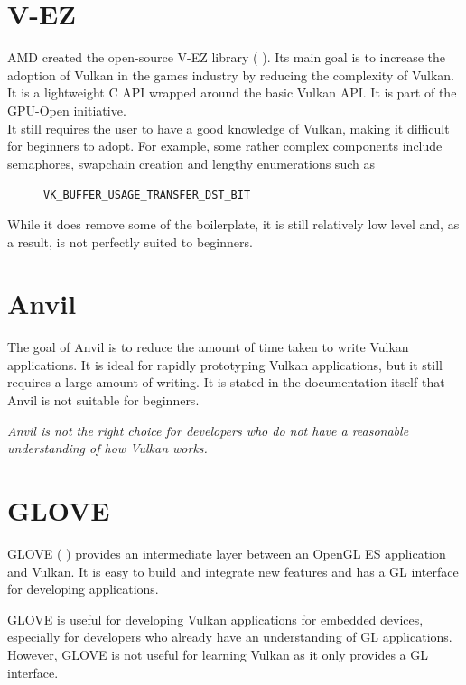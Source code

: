 \documentclass[12pt]{report}
\newcommand{\citesoftware}[1]{(\citeauthor{#1} \citeyear{#1})}
\newcommand{\quotebu}[1]
{
  \begin{displayquote}
    \textit{#1}
  \end{displayquote}
}
\theoremstyle{definition}
\begin{document}
    \section{V-EZ}

      AMD created the open-source V-EZ library \citesoftware{vez}. Its main goal is to increase the
      adoption of Vulkan in the games industry by reducing the complexity of
      Vulkan. It is a lightweight C API wrapped around the basic Vulkan API.
      It is part of the GPU-Open initiative. \\
      
      It still requires the user to have a good knowledge of Vulkan, making it
      difficult for beginners to adopt. For example, some rather complex
      components include semaphores, swapchain creation and lengthy
      enumerations such as

        \begin{figure}[h!]
        \centering
        \verb|VK_BUFFER_USAGE_TRANSFER_DST_BIT|
        \end{figure}

      While it does remove some of the boilerplate, it is still relatively low
      level and, as a result, is not perfectly suited to beginners.

    \section{Anvil}

      The goal of Anvil is to reduce the amount of time taken to write Vulkan
      applications. It is ideal for rapidly prototyping Vulkan applications,
      but it still requires a large amount of writing. It is stated in the
      documentation itself that Anvil is not suitable for beginners.

      \quotebu{
        Anvil is not the right choice for developers who do not have a
        reasonable understanding of how Vulkan works.
      }

    \section{GLOVE}

      GLOVE \citesoftware{glove} provides an intermediate layer
      between an OpenGL ES application and Vulkan. It is easy to build and
      integrate new features and has a GL interface for developing applications.

      GLOVE is useful for developing Vulkan applications for embedded devices,
      especially for developers who already have an understanding of GL
      applications. However, GLOVE is not useful for learning Vulkan
      as it only provides a GL interface.
\end{document}
